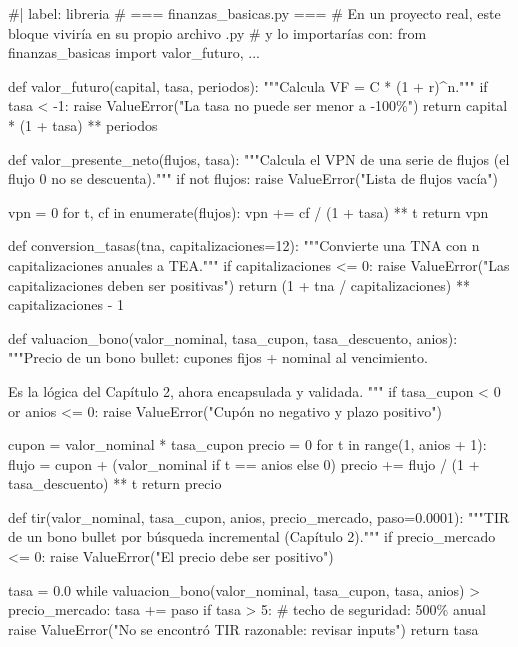 \documentclass[
  spanish,
  letterpaper,
  DIV=11,
  numbers=noendperiod]{scrreprt}
\newenvironment{Shaded}{\begin{snugshade}}{\end{snugshade}}
\newcommand{\NormalTok}[1]{\textcolor[rgb]{0.00,0.23,0.31}{#1}}
\begin{document}
\begin{Shaded}
\begin{Highlighting}[]
\NormalTok{\#| label: libreria}
\NormalTok{\# === finanzas\_basicas.py ===}
\NormalTok{\# En un proyecto real, este bloque viviría en su propio archivo .py}
\NormalTok{\# y lo importarías con: from finanzas\_basicas import valor\_futuro, ...}

\NormalTok{def valor\_futuro(capital, tasa, periodos):}
\NormalTok{    """Calcula VF = C * (1 + r)\^{}n."""}
\NormalTok{    if tasa \textless{} {-}1:}
\NormalTok{        raise ValueError("La tasa no puede ser menor a {-}100\%")}
\NormalTok{    return capital * (1 + tasa) ** periodos}


\NormalTok{def valor\_presente\_neto(flujos, tasa):}
\NormalTok{    """Calcula el VPN de una serie de flujos (el flujo 0 no se descuenta)."""}
\NormalTok{    if not flujos:}
\NormalTok{        raise ValueError("Lista de flujos vacía")}

\NormalTok{    vpn = 0}
\NormalTok{    for t, cf in enumerate(flujos):}
\NormalTok{        vpn += cf / (1 + tasa) ** t}
\NormalTok{    return vpn}


\NormalTok{def conversion\_tasas(tna, capitalizaciones=12):}
\NormalTok{    """Convierte una TNA con n capitalizaciones anuales a TEA."""}
\NormalTok{    if capitalizaciones \textless{}= 0:}
\NormalTok{        raise ValueError("Las capitalizaciones deben ser positivas")}
\NormalTok{    return (1 + tna / capitalizaciones) ** capitalizaciones {-} 1}


\NormalTok{def valuacion\_bono(valor\_nominal, tasa\_cupon, tasa\_descuento, anios):}
\NormalTok{    """Precio de un bono bullet: cupones fijos + nominal al vencimiento.}

\NormalTok{    Es la lógica del Capítulo 2, ahora encapsulada y validada.}
\NormalTok{    """}
\NormalTok{    if tasa\_cupon \textless{} 0 or anios \textless{}= 0:}
\NormalTok{        raise ValueError("Cupón no negativo y plazo positivo")}

\NormalTok{    cupon = valor\_nominal * tasa\_cupon}
\NormalTok{    precio = 0}
\NormalTok{    for t in range(1, anios + 1):}
\NormalTok{        flujo = cupon + (valor\_nominal if t == anios else 0)}
\NormalTok{        precio += flujo / (1 + tasa\_descuento) ** t}
\NormalTok{    return precio}


\NormalTok{def tir(valor\_nominal, tasa\_cupon, anios, precio\_mercado, paso=0.0001):}
\NormalTok{    """TIR de un bono bullet por búsqueda incremental (Capítulo 2)."""}
\NormalTok{    if precio\_mercado \textless{}= 0:}
\NormalTok{        raise ValueError("El precio debe ser positivo")}

\NormalTok{    tasa = 0.0}
\NormalTok{    while valuacion\_bono(valor\_nominal, tasa\_cupon, tasa, anios) \textgreater{} precio\_mercado:}
\NormalTok{        tasa += paso}
\NormalTok{        if tasa \textgreater{} 5:   \# techo de seguridad: 500\% anual}
\NormalTok{            raise ValueError("No se encontró TIR razonable: revisar inputs")}
\NormalTok{    return tasa}
\end{Highlighting}
\end{Shaded}
\end{document}
